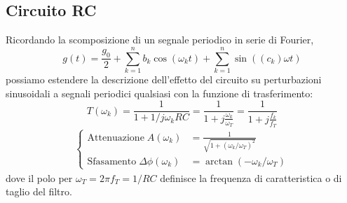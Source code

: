 \documentclass{article}[a4paper, oneside, 11pt]
\begin{document}
\subsection{Circuito RC}
Ricordando la scomposizione di un segnale periodico in serie di Fourier,
\begin{equation}
g(t) = \frac{g_0}{2} + \sum_{k=1}^{n} b_k \cos{(\omega_kt)} + 
\sum_{k=1}^{n} \sin{\left((c_k)\omega t\right)}
\end{equation}
possiamo estendere la descrizione dell'effetto del circuito su perturbazioni
sinusoidali a segnali periodici qualsiasi con la funzione di trasferimento:
\begin{equation}
	T(\omega_k) = \frac{1}{1 + 1/j\omega_k RC} = 
	\frac{1}{1 + j\frac{\omega_k}{\omega_T}} = \frac{1}{1 + j\frac{f_k}{f_T}}
\end{equation}
\begin{align*}\label{eq:fin}
\begin{cases}
	\mathrm{Attenuazione} \; A(\omega_k) &=
	\frac{1}{\sqrt{1 + \left(\omega_k/\omega_T \right)^2}} \\
	\mathrm{Sfasamento} \; \Delta \phi(\omega_k) &=
	\arctan{\left(- \omega_k /\omega_T \right)}
\end{cases}
\end{align*}
dove il polo per $\omega_T = 2\pi f_T = 1/RC$ definisce la frequenza di
caratteristica o di taglio del filtro.
\end{document}
